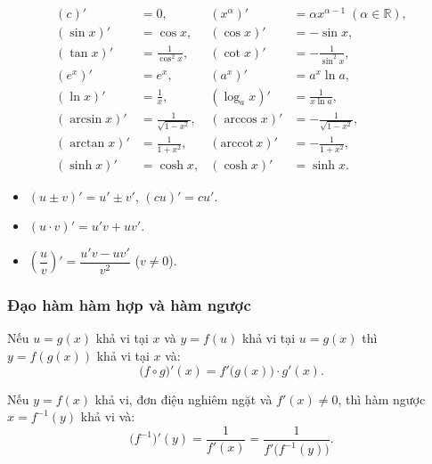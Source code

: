 \documentclass[12pt,a4paper]{article}
\begin{document}
\begin{congthuc}[title={Bảng đạo hàm cơ bản}]
  \begin{align*}
    (c)' &= 0, & (x^\alpha)' &= \alpha x^{\alpha - 1} \;(\alpha \in \mathbb{R}), \\
    (\sin x)' &= \cos x, & (\cos x)' &= -\sin x, \\
    (\tan x)' &= \frac{1}{\cos^2 x}, & (\cot x)' &= -\frac{1}{\sin^2 x}, \\
    (e^x)' &= e^x, & (a^x)' &= a^x \ln a, \\
    (\ln x)' &= \frac{1}{x}, & (\log_a x)' &= \frac{1}{x \ln a}, \\
    (\arcsin x)' &= \frac{1}{\sqrt{1-x^2}}, & (\arccos x)' &= -\frac{1}{\sqrt{1-x^2}}, \\
    (\arctan x)' &= \frac{1}{1+x^2}, & (\text{arccot}\, x)' &= -\frac{1}{1+x^2}, \\
    (\sinh x)' &= \cosh x, & (\cosh x)' &= \sinh x.
  \end{align*}
\end{congthuc}

\begin{congthuc}[title={Quy tắc tính đạo hàm}]
  \begin{itemize}
    \item $(u \pm v)' = u' \pm v'$, \quad $(cu)' = cu'$.
    \item $(u \cdot v)' = u'v + uv'$.
    \item $\left(\dfrac{u}{v}\right)' = \dfrac{u'v - uv'}{v^2}$ ($v \ne 0$).
  \end{itemize}
\end{congthuc}

\subsubsection{Đạo hàm hàm hợp và hàm ngược}

\begin{dinhly}[title={Đạo hàm hàm hợp (Chain rule)}]
  Nếu $u = g(x)$ khả vi tại $x$ và $y = f(u)$ khả vi tại $u = g(x)$ thì $y = f(g(x))$ khả vi tại $x$ và:
  \[
    \bigl(f \circ g\bigr)'(x) = f'\bigl(g(x)\bigr) \cdot g'(x).
  \]
\end{dinhly}

\begin{dinhly}[title={Đạo hàm hàm ngược}]
  Nếu $y = f(x)$ khả vi, đơn điệu nghiêm ngặt và $f'(x) \ne 0$, thì hàm ngược $x = f^{-1}(y)$ khả vi và:
  \[
    \bigl(f^{-1}\bigr)'(y) = \frac{1}{f'(x)} = \frac{1}{f'\bigl(f^{-1}(y)\bigr)}.
  \]
\end{dinhly}
\end{document}
